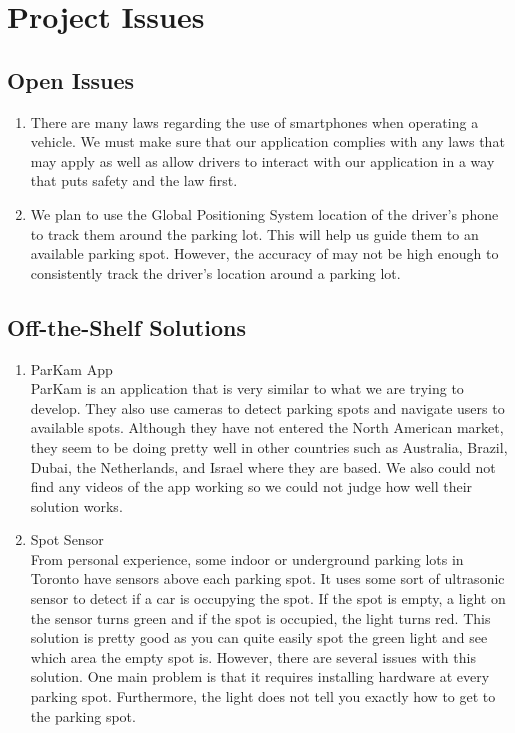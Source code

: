 \documentclass[12pt,letterpaper]{article}
\newcommand{\term}[2][]{\ifthenelse{\equal{#1}{}}{\hyperref[Term:#2]{\textbf{#2}}}{\hyperref[Term:#1]{\textbf{#2}}}}
\begin{document}
\newpage
\section{Project Issues}
\subsection{Open Issues}
\begin{enumerate}
    \item There are many laws regarding the use of smartphones when operating a
    vehicle. We must make sure that our application complies with any laws that
    may apply as well as allow drivers to interact with our application in a way
    that puts safety and the law first.
    
    \item We plan to use the Global Positioning System location of the driver's
    phone to track them around the parking lot. This will help us guide them to
    an available parking spot. However, the accuracy of \term{GPS} may not be
    high enough to consistently track the driver's location around a parking
    lot.
\end{enumerate}

\subsection{Off-the-Shelf Solutions}
\begin{enumerate}
    \item ParKam App\\
    ParKam is an application that is very similar to what we are trying to
    develop. They also use cameras to detect parking spots and navigate users to
    available spots. Although they have not entered the North American market,
    they seem to be doing pretty well in other countries such as Australia,
    Brazil, Dubai, the Netherlands, and Israel where they are based. We also
    could not find any videos of the app working so we could not judge how well
    their solution works.
    
    \item Spot Sensor\\
    From personal experience, some indoor or underground parking lots in Toronto
    have sensors above each parking spot. It uses some sort of ultrasonic sensor
    to detect if a car is occupying the spot. If the spot is empty, a light on
    the sensor turns green and if the spot is occupied, the light turns red.
    This solution is pretty good as you can quite easily spot the green light
    and see which area the empty spot is. However, there are several issues with
    this solution. One main problem is that it requires installing hardware at
    every parking spot. Furthermore, the light does not tell you exactly how to
    get to the parking spot.
\end{enumerate}
\end{document}
